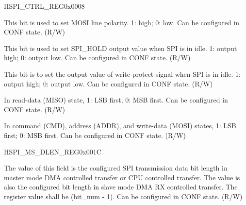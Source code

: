 \begin{register}{H}{SPI\_CTRL\_REG}{0x0008}
\begin{regdesc}
\begin{reglist}
\label{fielddesc:SPIDPOL}\item [SPI\_D\_POL] This bit is used to set MOSI line polarity. 1: high; 0: low. Can be configured in CONF state. (R/W)
\label{fielddesc:SPIHOLDPOL}\item [SPI\_HOLD\_POL] This bit is used to set SPI\_HOLD output value when SPI is in idle. 1: output high; 0: output low. Can be configured in CONF state. (R/W)
\label{fielddesc:SPIWPPOL}\item [SPI\_WP\_POL] This bit is to set the output value of write-protect signal when SPI is in idle. 1: output high; 0: output low. Can be configured in CONF state. (R/W)
\label{fielddesc:SPIRDBITORDER}\item [SPI\_RD\_BIT\_ORDER] In read-data (MISO) state, 1: LSB first; 0: MSB first. Can be configured in CONF state. (R/W)
\label{fielddesc:SPIWRBITORDER}\item [SPI\_WR\_BIT\_ORDER] In command (CMD), address (ADDR), and write-data (MOSI) states, 1: LSB first; 0: MSB first. Can be configured in CONF state. (R/W)
\end{reglist}\end{regdesc}
\end{register}


\begin{register}{H}{SPI\_MS\_DLEN\_REG}{0x001C}\label{regdesc:SPIMSDLENREG}
%
%
\regnewline%
\begin{regdesc}\begin{reglist}
\label{fielddesc:SPIMSDATABITLEN}\item [SPI\_MS\_DATA\_BITLEN] The value of this field is the configured SPI transmission data bit length in master mode DMA controlled transfer or CPU controlled transfer. The value is also the configured bit length in slave mode DMA RX controlled transfer. The register value shall be (bit\_num - 1). Can be configured in CONF state. (R/W)
\end{reglist}\end{regdesc}
\end{register}


